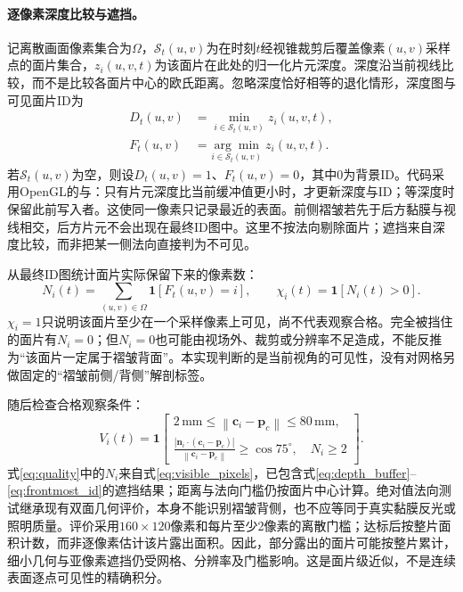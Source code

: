 \documentclass[UTF8,a4paper,zihao=5,fontset=windows]{ctexart}
\newcommand{\vect}[1]{\bm{#1}}
\newcommand{\norm}[1]{\left\lVert#1\right\rVert}
\newcommand{\unit}[1]{\,\mathrm{#1}}
\newcommand{\code}[1]{\texttt{\detokenize{#1}}}
\begin{document}
\paragraph{逐像素深度比较与遮挡。}
记离散画面像素集合为$\Omega$，$\mathcal S_t(u,v)$为在时刻$t$经视锥裁剪后覆盖像素$(u,v)$采样点的面片集合，$z_i(u,v,t)$为该面片在此处的归一化片元深度。深度沿当前视线比较，而不是比较各面片中心的欧氏距离。忽略深度恰好相等的退化情形，深度图与可见面片ID为
\begin{align}
 D_t(u,v)&=\min_{i\in\mathcal S_t(u,v)}z_i(u,v,t),\label{eq:depth_buffer}\\
 F_t(u,v)&=\underset{i\in\mathcal S_t(u,v)}{\arg\min}\ z_i(u,v,t).
 \label{eq:frontmost_id}
\end{align}
若$\mathcal S_t(u,v)$为空，则设$D_t(u,v)=1$、$F_t(u,v)=0$，其中0为背景ID。代码采用OpenGL的\code{GL_DEPTH_TEST}与\code{GL_LESS}：只有片元深度比当前缓冲值更小时，才更新深度与ID；等深度时保留此前写入者。这使同一像素只记录最近的表面。前侧褶皱若先于后方黏膜与视线相交，后方片元不会出现在最终ID图中。这里不按法向剔除面片；遮挡来自深度比较，而非把某一侧法向直接判为不可见。

从最终ID图统计面片实际保留下来的像素数：
\begin{equation}
 N_i(t)=\sum_{(u,v)\in\Omega}\mathbf1[F_t(u,v)=i],
 \qquad \chi_i(t)=\mathbf1[N_i(t)>0].
 \label{eq:visible_pixels}
\end{equation}
$\chi_i=1$只说明该面片至少在一个采样像素上可见，尚不代表观察合格。完全被挡住的面片有$N_i=0$；但$N_i=0$也可能由视场外、裁剪或分辨率不足造成，不能反推为“该面片一定属于褶皱背面”。本实现判断的是当前视角的可见性，没有对网格另做固定的“褶皱前侧/背侧”解剖标签。

随后检查合格观察条件：
\begin{equation}
V_i(t)=\mathbf1\left[\begin{gathered}
2\unit{mm}\le\norm{\vect c_i-\vect p_c}\le80\unit{mm},\\
\frac{|\vect n_i\cdot(\vect c_i-\vect p_c)|}{\norm{\vect c_i-\vect p_c}}\ge\cos75^\circ,\quad N_i\ge2
\end{gathered}\right].
\label{eq:quality}
\end{equation}
式\eqref{eq:quality}中的$N_i$来自式\eqref{eq:visible_pixels}，已包含式\eqref{eq:depth_buffer}--\eqref{eq:frontmost_id}的遮挡结果；距离与法向门槛仍按面片中心计算。绝对值法向测试继承现有双面几何评价，本身不能识别褶皱背侧，也不应等同于真实黏膜反光或照明质量。评价采用$160\times120$像素和每片至少2像素的离散门槛；达标后按整片面积计数，而非逐像素估计该片露出面积。因此，部分露出的面片可能按整片累计，细小几何与亚像素遮挡仍受网格、分辨率及门槛影响。这是面片级近似，不是连续表面逐点可见性的精确积分。
\end{document}
